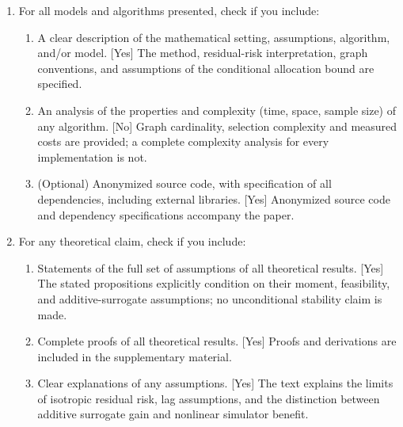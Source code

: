 \begin{enumerate}

  \item For all models and algorithms presented, check if you include:
  \begin{enumerate}
    \item A clear description of the mathematical setting, assumptions, algorithm, and/or model. [Yes] The method, residual-risk interpretation, graph conventions, and assumptions of the conditional allocation bound are specified.
    \item An analysis of the properties and complexity (time, space, sample size) of any algorithm. [No] Graph cardinality, selection complexity and measured costs are provided; a complete complexity analysis for every implementation is not.
    \item (Optional) Anonymized source code, with specification of all dependencies, including external libraries. [Yes] Anonymized source code and dependency specifications accompany the paper.
  \end{enumerate}

  \item For any theoretical claim, check if you include:
  \begin{enumerate}
    \item Statements of the full set of assumptions of all theoretical results. [Yes] The stated propositions explicitly condition on their moment, feasibility, and additive-surrogate assumptions; no unconditional stability claim is made.
    \item Complete proofs of all theoretical results. [Yes] Proofs and derivations are included in the supplementary material.
    \item Clear explanations of any assumptions. [Yes] The text explains the limits of isotropic residual risk, lag assumptions, and the distinction between additive surrogate gain and nonlinear simulator benefit.
  \end{enumerate}


\end{enumerate}
